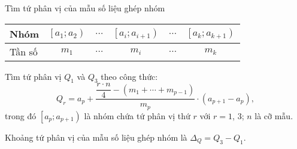 \begin{dang}{Tìm tứ phân vị của mẫu số liệu ghép nhóm}
	\begin{center}
		\begin{tabular}{|l|c|c|c|c|c|}
			\hline Nhóm &{$\left[a_1; a_2\right)$} & $\ldots$ &{$\left[a_i; a_{i+1}\right)$} & $\ldots$ &{$\left[a_k; a_{k+1}\right)$} \\
			\hline Tần số & $m_1$ & $\ldots$ & $m_i$ & $\ldots$ & $m_k$ \\
			\hline
		\end{tabular}
	\end{center}
	\begin{listEX}[1]
		\item [\ding{172}] Tìm tứ phân vị $ Q_1$ và $Q_3 $ theo công thức:
		$$Q_r=a_p+\dfrac{\dfrac{r \cdot n}{4}-\left(m_1+\cdots+m_{p-1}\right)}{m_p} \cdot\left(a_{p+1}-a_p\right), $$
		trong đó $\left[a_p; a_{p+1}\right)$ là nhóm chứa tứ phân vị thứ $r$ với $r=1$, $3$; \quad $n$ là cỡ mẫu.
		\item [\ding{173}] Khoảng tứ phân vị của mẫu số liệu ghép nhóm là $\Delta_Q=Q_3-Q_1$.
	\end{listEX}
\end{dang}
\viduminhhoa
\setcounter{vd}{0}
